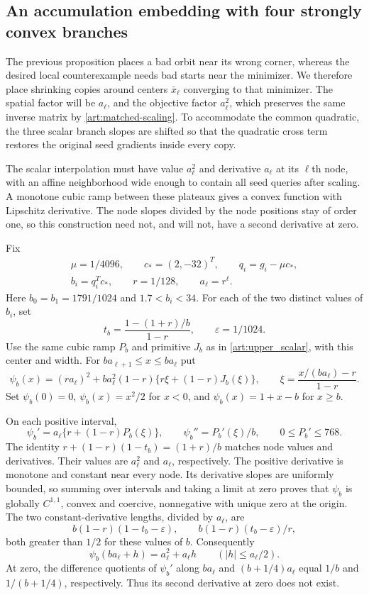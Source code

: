 \subsection{An accumulation embedding with four strongly convex branches}
The previous proposition places a bad orbit near its wrong corner,
whereas the desired local counterexample needs bad starts near the
minimizer. We therefore place shrinking copies around centers $\bar x_\ell$
converging to that minimizer. The spatial factor will be $a_\ell$, and the
objective factor $a_\ell^2$, which preserves the same inverse matrix by
\eqref{art:matched-scaling}. To accommodate the common quadratic, the
three scalar branch slopes are shifted so that the quadratic cross term
restores the original seed gradients inside every copy.

The scalar interpolation must have value $a_\ell^2$ and derivative $a_\ell$
at its $\ell$th node, with an affine neighborhood wide enough to contain
all seed queries after scaling. A monotone cubic ramp between these
plateaux gives a convex function with Lipschitz derivative. The node
slopes divided by the node positions stay of order one, so this
construction need not, and will not, have a second derivative at zero.

Fix
\begin{gather*}
 \mu=1/4096,\qquad c_*=(2,-32)^T,\qquad q_i=g_i-\mu c_*,\\
 b_i=q_i^Tc_*,\qquad r=1/128,\qquad a_\ell=r^\ell.
\end{gather*}
Here $b_0=b_1=1791/1024$ and $1.7<b_i<34$. For each of the two distinct
values of $b_i$, set
\[
 t_b=\frac{1-(1+r)/b}{1-r},\qquad\varepsilon=1/1024.
\]
Use the same cubic ramp $P_b$ and primitive $J_b$ as in
\eqref{art:upper_scalar}, with this center and width. For
$ba_{\ell+1}\le x\le ba_\ell$ put
\begin{equation}\label{art:lower_scalar}
 \psi_b(x)=(ra_\ell)^2+ba_\ell^2(1-r)
       \{r\xi+(1-r)J_b(\xi)\},\qquad
 \xi=\frac{x/(ba_\ell)-r}{1-r}.
\end{equation}
Set $\psi_b(0)=0$, $\psi_b(x)=x^2/2$ for $x<0$, and
$\psi_b(x)=1+x-b$ for $x\ge b$.

On each positive interval,
\[
 \psi_b'=a_\ell\{r+(1-r)P_b(\xi)\},\qquad
 \psi_b''=P_b'(\xi)/b,\qquad0\le P_b'\le768.
\]
The identity $r+(1-r)(1-t_b)=(1+r)/b$ matches node values and
derivatives. Their values are $a_\ell^2$ and $a_\ell$, respectively.
The positive derivative is monotone and constant near every node.
Its derivative slopes are uniformly bounded, so summing over intervals
and taking a limit at zero proves that $\psi_b$ is globally $C^{1,1}$,
convex and coercive, nonnegative with unique zero at the origin.
The two constant-derivative lengths, divided by $a_\ell$, are
\[
 b(1-r)(1-t_b-\varepsilon),\qquad
 b(1-r)(t_b-\varepsilon)/r,
\]
both greater than $1/2$ for these values of $b$. Consequently
\begin{equation}\label{art:lower_plateau}
 \psi_b(ba_\ell+h)=a_\ell^2+a_\ell h\qquad(|h|\le a_\ell/2).
\end{equation}
At zero, the difference quotients of $\psi_b'$ along $ba_\ell$ and
$(b+1/4)a_\ell$ equal $1/b$ and $1/(b+1/4)$, respectively. Thus its second
derivative at zero does not exist.

